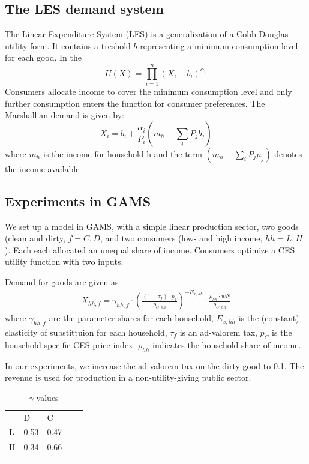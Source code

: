 \subsection{The LES demand system}
The Linear Expenditure System (LES) is a generalization of a Cobb-Douglas utility form. It contains a treshold \(b\) representing a minimum consumption level for each good. In the %
\begin{equation}
U(X)=\prod_{i=1}^n (X_i-b_i)^{\alpha_i}
\end{equation}Consumers allocate income to cover the minimum consumption level and only further consumption enters the function for consumer preferences. The Marshallian demand is given by:
\begin{equation}
X_i = b_i+\frac{\alpha_i}{P_i}(m_h-\sum_i P_j b_j)
\end{equation}where \(m_h\) is the income for household h and the term \((m_h-\sum_iP_j\mu_j)\) denotes the income available %

\subsection{Experiments in GAMS}
We set up a model in GAMS, with a simple linear production sector, two goods (clean and dirty, $f=C,D$, and two consumers (low- and high income, $hh=L,H$). Each  each allocated an unequal share of income. Consumers optimize a CES utility function with two inputs.

Demand for goods are given as
\begin{align}
    X_{hh,f} = \gamma_{hh,f} \cdot \left(\frac{(1+\tau_{f})\cdot p_{f}}{p_{C,hh}}\right)^{-E_{x,hh}} \cdot \frac{\rho_{hh} \cdot w N}{p_{C,hh}}
\end{align}
where $\gamma_{hh,f}$ are the parameter shares for each household, $E_{x,hh}$ is the (constant) elasticity of substittuion for each household, $\tau_f$ is an ad-valorem tax, $p_C$ is the household-specific CES price index. $\rho_{hh}$ indicates the household share of income.

In our experiments, we increase the ad-valorem tax on the dirty good to 0.1. The revenue is used for production in a non-utility-giving public sector.


\begin{table}[]
\caption{$\gamma$ values}
\centering
\begin{tabular}{lllll}
  & D    & C    &  &  \\
L & 0.53 & 0.47 &  &  \\
H & 0.34 & 0.66 &  &  \\
  &      &      &  & 
\end{tabular}
\end{table}


